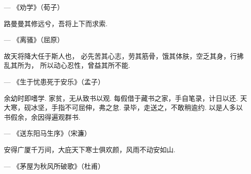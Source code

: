 \hfill
--- 《劝学》（荀子）

路曼曼其修远兮，吾将上下而求索.

\hfill
--- 《离骚》（屈原）

故天将降大任于斯人也，
必先苦其心志，劳其筋骨，饿其体肤，空乏其身，行拂乱其所为，
所以动心忍性，曾益其所不能.

\hfill
--- 《生于忧患死于安乐》（孟子）

余幼时即嗜学.
家贫，无从致书以观.
每假借于藏书之家，手自笔录，计日以还.
天大寒，砚冰坚，手指不可屈伸，弗之怠.
录毕，走送之，不敢稍逾约.
以是人多以书假余，余因得遍观群书.

\hfill
--- 《送东阳马生序》（宋濂）

安得广厦千万间，大庇天下寒士俱欢颜，风雨不动安如山.

\hfill
--- 《茅屋为秋风所破歌》（杜甫）

\hspace{1pt}
